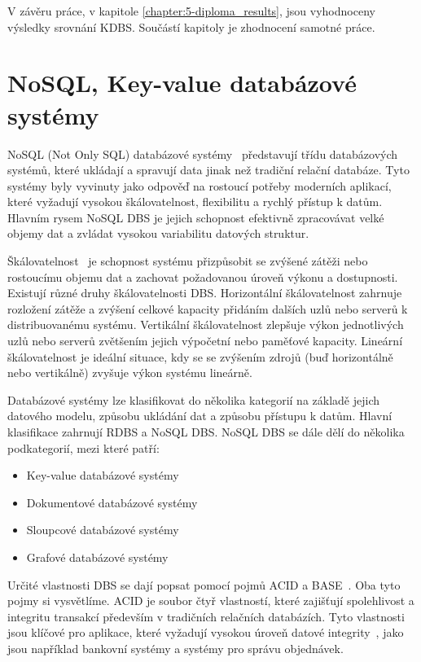 \documentclass[czech,master,dept460,male,csharp,cpdeclaration]{diploma}
\begin{document}
	V závěru práce, v kapitole \ref{chapter:5-diploma_results}, jsou vyhodnoceny výsledky srovnání KDBS. Součástí kapitoly je zhodnocení samotné práce.
	
	\chapter{NoSQL, Key-value databázové systémy\label{chapter:no-sql-ky-sys}}
	
	NoSQL (Not Only SQL) databázové systémy~\cite{nosql} představují třídu databázových systémů, které ukládají a spravují data jinak než tradiční relační databáze. Tyto systémy byly vyvinuty jako odpověď na rostoucí potřeby moderních aplikací, které vyžadují vysokou škálovatelnost, flexibilitu a rychlý přístup k datům. Hlavním rysem NoSQL DBS je jejich schopnost efektivně zpracovávat velké objemy dat a zvládat vysokou variabilitu datových struktur.
	
	Škálovatelnost~\cite{scalability}\label{scaling-dbs} je schopnost systému přizpůsobit se zvýšené zátěži nebo rostoucímu objemu dat a zachovat požadovanou úroveň výkonu a dostupnosti. Existují různé druhy škálovatelnosti DBS. Horizontální škálovatelnost zahrnuje rozložení zátěže a zvýšení celkové kapacity přidáním dalších uzlů nebo serverů k distribuovanému systému. Vertikální škálovatelnost zlepšuje výkon jednotlivých uzlů nebo serverů zvětšením jejich výpočetní nebo paměťové kapacity. Lineární škálovatelnost je ideální situace, kdy se se zvýšením zdrojů (buď horizontálně nebo vertikálně) zvyšuje výkon systému lineárně.
	
	Databázové systémy lze klasifikovat do několika kategorií na základě jejich datového modelu, způsobu ukládání dat a způsobu přístupu k datům. Hlavní klasifikace zahrnují RDBS a NoSQL DBS. NoSQL DBS se dále dělí do několika podkategorií, mezi které patří:
	
	\begin{itemize}
		\item Key-value databázové systémy
		\item Dokumentové databázové systémy
		\item Sloupcové databázové systémy
		\item Grafové databázové systémy
	\end{itemize}
	
	Určité vlastnosti DBS se dají popsat pomocí pojmů ACID a BASE~\cite{acid-vs-base}. Oba tyto pojmy si vysvětlíme. ACID je soubor čtyř vlastností, které zajišťují spolehlivost a integritu transakcí především v tradičních relačních databázích. Tyto vlastnosti jsou klíčové pro aplikace, které vyžadují vysokou úroveň datové integrity~\cite{integrita}, jako jsou například bankovní systémy a systémy pro správu objednávek.
	
\end{document}
